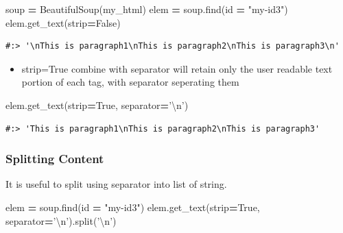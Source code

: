 \documentclass[
]{book}
\newenvironment{Shaded}{\begin{snugshade}}{\end{snugshade}}
\newcommand{\BuiltInTok}[1]{#1}
\newcommand{\CharTok}[1]{\textcolor[rgb]{0.5,0.5,0.5}{#1}}
\newcommand{\NormalTok}[1]{#1}
\newcommand{\OperatorTok}[1]{\textcolor[rgb]{0.43,0.43,0.43}{\textbf{#1}}}
\newcommand{\StringTok}[1]{\textcolor[rgb]{0.5,0.5,0.5}{#1}}
\newcommand{\VariableTok}[1]{\textcolor[rgb]{0,0,0}{#1}}
\providecommand{\tightlist}{%
  \setlength{\itemsep}{0pt}\setlength{\parskip}{0pt}}
\begin{document}
\begin{Shaded}
\begin{Highlighting}[]
\NormalTok{soup }\OperatorTok{=}\NormalTok{ BeautifulSoup(my_html)}
\NormalTok{elem }\OperatorTok{=}\NormalTok{ soup.find(}\BuiltInTok{id} \OperatorTok{=} \StringTok{"my-id3"}\NormalTok{)}
\NormalTok{elem.get_text(strip}\OperatorTok{=}\VariableTok{False}\NormalTok{)}
\end{Highlighting}
\end{Shaded}

\begin{verbatim}
#:> '\nThis is paragraph1\nThis is paragraph2\nThis is paragraph3\n'
\end{verbatim}

\begin{itemize}
\tightlist
\item
  strip=True combine with separator will retain only the user readable text portion of each tag, with separator seperating them
\end{itemize}

\begin{Shaded}
\begin{Highlighting}[]
\NormalTok{elem.get_text(strip}\OperatorTok{=}\VariableTok{True}\NormalTok{, separator}\OperatorTok{=}\StringTok{'}\CharTok{\textbackslash{}n}\StringTok{'}\NormalTok{)}
\end{Highlighting}
\end{Shaded}

\begin{verbatim}
#:> 'This is paragraph1\nThis is paragraph2\nThis is paragraph3'
\end{verbatim}

\hypertarget{splitting-content}{%
\subsubsection{Splitting Content}\label{splitting-content}}

It is useful to split using separator into list of string.

\begin{Shaded}
\begin{Highlighting}[]
\NormalTok{elem }\OperatorTok{=}\NormalTok{ soup.find(}\BuiltInTok{id} \OperatorTok{=} \StringTok{"my-id3"}\NormalTok{)}
\NormalTok{elem.get_text(strip}\OperatorTok{=}\VariableTok{True}\NormalTok{, separator}\OperatorTok{=}\StringTok{'}\CharTok{\textbackslash{}n}\StringTok{'}\NormalTok{).split(}\StringTok{'}\CharTok{\textbackslash{}n}\StringTok{'}\NormalTok{)}
\end{Highlighting}
\end{Shaded}
\end{document}
